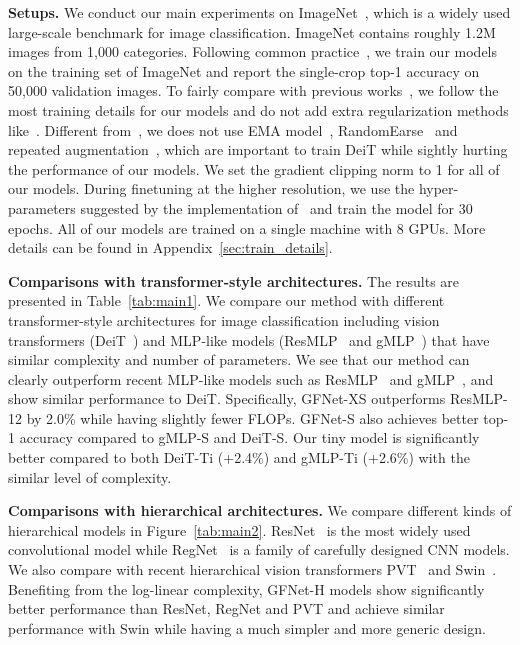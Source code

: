 \documentclass{article}
\numberwithin{equation}{section}
\newcommand{\paragrapha}[2][1pt]{\vspace{#1}\noindent\textbf{#2}}
\begin{document}
\paragrapha{Setups.} We conduct our main experiments on ImageNet~\cite{deng2009imagenet}, which is a widely used large-scale benchmark for image classification. ImageNet contains roughly 1.2M images from 1,000 categories. Following common practice~\cite{he2016deep,touvron2020deit}, we train our models on the training set of ImageNet and report the single-crop top-1 accuracy on 50,000 validation images. To fairly compare with previous works~\cite{touvron2020deit,touvron2021resmlp}, we follow the most training details for our models and do not add extra regularization methods like~\cite{jiang2021token}. Different from~\cite{touvron2020deit}, we does not use EMA model~\cite{ema}, RandomEarse~\cite{zhong2020randomerasing} and repeated augmentation~\cite{repeataug}, which are important to train DeiT while sightly hurting the performance of our models. We set the gradient clipping norm to 1 for all of our models. During finetuning at the higher resolution, we use the hyper-parameters suggested by the implementation of~\cite{touvron2020deit} and train the model for 30 epochs. All of our models are trained on a single machine with 8 GPUs. More details can be found in Appendix~\ref{sec:train_details}.


\paragrapha{Comparisons with transformer-style architectures.} The results are presented in Table~\ref{tab:main1}. We compare our method with different  transformer-style architectures for image classification including vision transformers (DeiT~\cite{touvron2020deit}) and MLP-like models (ResMLP~\cite{touvron2021resmlp} and gMLP~\cite{liu2021pay}) that have similar complexity and number of parameters. We see that our method can clearly outperform recent MLP-like models such as ResMLP~\cite{touvron2021resmlp} and gMLP~\cite{liu2021pay}, and show similar performance to DeiT. Specifically, GFNet-XS outperforms ResMLP-12 by 2.0\% while having slightly fewer FLOPs. GFNet-S also achieves better top-1 accuracy compared to gMLP-S and DeiT-S. Our tiny model is significantly better compared to both DeiT-Ti (+2.4\%) and gMLP-Ti (+2.6\%) with the similar level of complexity. 

\paragrapha{Comparisons with hierarchical architectures.} We compare different kinds of hierarchical models in Figure~\ref{tab:main2}. ResNet~\cite{he2016deep} is the most widely used convolutional model while RegNet~\cite{regnet} is a family of carefully designed CNN models. We also compare with recent hierarchical vision transformers PVT~\cite{wang2021pyramid} and Swin~\cite{liu2021swin}. Benefiting from the log-linear complexity, GFNet-H models show significantly better performance than ResNet, RegNet and PVT and achieve similar performance with Swin while having a much simpler and more generic design. 
\end{document}
